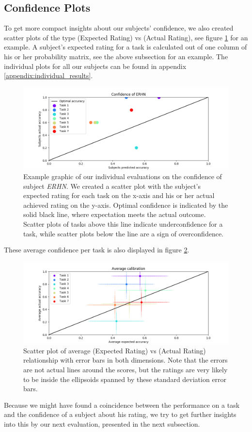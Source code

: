 \documentclass[../main/main.tex]{subfiles}
\begin{document}
\subsection{Confidence Plots}
To get more compact insights about our subjects' confidence, we also created scatter plots of the type (Expected Rating) vs (Actual Rating), see figure \ref{fig:erhn_confidence} for an example. A subject's expected rating for a task is calculated out of one column of his or her probability matrix, see the above subsection for an example. The individual plots for all our subjects can be found in appendix \ref{appendix:individual_results}.
\begin{figure}[H]
	\centering
	\captionsetup{justification=centering}
	\includegraphics[width=\textwidth]{../assets/ERHN_confidence.png}
	\caption{Example graphic of our individual evaluations on the confidence of subject \textit{ERHN}. We created a scatter plot with the subject's expected rating for each task on the x-axis and his or her actual achieved rating on the y-axis. Optimal confidence is indicated by the solid black line, where expectation meets the actual outcome. Scatter plots of tasks above this line indicate underconfidence for a task, while scatter plots below the line are a sign of overconfidence.}
	\label{fig:erhn_confidence} 
\end{figure}
These average confidence per task is also displayed in figure \ref{fig:avg_confidence}.
\begin{figure}[H]
	\centering
	\captionsetup{justification=centering}
	\includegraphics[width=\textwidth]{../assets/average_calibration.png}
	\caption{Scatter plot of average (Expected Rating) vs (Actual Rating) relationship with error bars in both dimensions. Note that the errors are not actual lines around the scores, but the ratings are very likely to be inside the ellipsoids spanned by these standard deviation error bars.}
	\label{fig:avg_confidence} 
\end{figure}
Because we might have found a coincidence between the performance on a task and the confidence of a subject about his rating, we try to get further insights into this by our next evaluation, presented in the next subsection.
\end{document}
